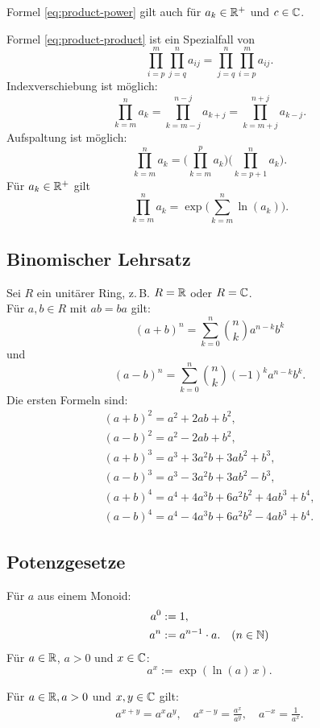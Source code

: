 Formel \eqref{eq:product-power} gilt auch für $a_k\in\mathbb R^+$ und $c\in\mathbb C$.

Formel \eqref{eq:product-product} ist ein Spezialfall von
\begin{equation}
\prod_{i=p}^m \prod_{j=q}^n a_{ij} = \prod_{j=q}^n \prod_{i=p}^m a_{ij}.
\end{equation}
Indexverschiebung ist möglich:
\begin{equation}
\prod_{k=m}^n a_k = \prod_{k=m-j}^{n-j} a_{k+j} = \prod_{k=m+j}^{n+j} a_{k-j}.
\end{equation}
Aufspaltung ist möglich:
\begin{equation}
\prod_{k=m}^n a_k = \bigg(\prod_{k=m}^p a_k\bigg)\bigg(\prod_{k=p+1}^n a_k\bigg).
\end{equation}
Für $a_k\in\mathbb R^+$ gilt
\begin{equation}
\prod_{k=m}^n a_k = \exp\bigg(\sum_{k=m}^n \ln(a_k)\bigg).
\end{equation}

\subsection{Binomischer Lehrsatz}
Sei $R$ ein unitärer Ring, z.\,B. $R=\mathbb R$ oder $R=\mathbb C$.\\
Für $a,b\in R$ mit $ab=ba$ gilt:%
\begin{equation}
(a+b)^n = \sum_{k=0}^n \binom{n}{k} a^{n-k} b^k
\end{equation}
und
\begin{equation}
(a-b)^n = \sum_{k=0}^n \binom{n}{k} (-1)^k a^{n-k} b^k.
\end{equation}
Die ersten Formeln sind:
\begin{gather}
(a+b)^2 = a^2+2ab+b^2,\\
(a-b)^2 = a^2-2ab+b^2,\\
(a+b)^3 = a^3+3a^2 b+3ab^2+b^3,\\
(a-b)^3 = a^3-3a^2 b+3ab^2-b^3,\\
(a+b)^4 = a^4+4a^3 b+6a^2 b^2+4ab^3+b^4,\\
(a-b)^4 = a^4-4a^3 b+6a^2 b^2-4ab^3+b^4.
\end{gather}
\subsection{Potenzgesetze}
\begin{definition}[Potenz]
Für $a$ aus einem Monoid:
\begin{align}
a^0 &:= 1,\\
a^n &:= a^{n-1}\cdot a.\quad (n\in\mathbb N)
\end{align}
Für $a\in\mathbb R$, $a>0$ und $x\in\mathbb C$:
\begin{equation}
a^x := \exp(\ln(a)\,x).
\end{equation}
\end{definition}
\noindent
Für $a\in\mathbb R, a>0$ und $x,y\in\mathbb C$ gilt:
\begin{gather}
a^{x+y} = a^x a^y,\quad a^{x-y} = \frac{a^x}{a^y},
\quad a^{-x} = \frac{1}{a^x}.
\end{gather}

